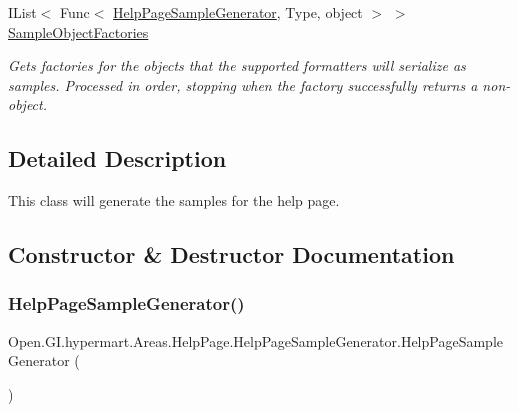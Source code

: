 \begin{DoxyCompactItemize}
I\+List$<$ Func$<$ \hyperlink{class_open_1_1_g_i_1_1hypermart_1_1_areas_1_1_help_page_1_1_help_page_sample_generator}{Help\+Page\+Sample\+Generator}, Type, object $>$ $>$ \hyperlink{class_open_1_1_g_i_1_1hypermart_1_1_areas_1_1_help_page_1_1_help_page_sample_generator_a659aa13a69376385d931264d06fbd398}{Sample\+Object\+Factories}
\begin{DoxyCompactList}\small\item\em Gets factories for the objects that the supported formatters will serialize as samples. Processed in order, stopping when the factory successfully returns a non-\/ object. \end{DoxyCompactList}\end{DoxyCompactItemize}


\subsection{Detailed Description}
This class will generate the samples for the help page. 



\subsection{Constructor \& Destructor Documentation}
\hypertarget{class_open_1_1_g_i_1_1hypermart_1_1_areas_1_1_help_page_1_1_help_page_sample_generator_aa3984bba40389ce2ca9530e02a6a2eff}{}\label{class_open_1_1_g_i_1_1hypermart_1_1_areas_1_1_help_page_1_1_help_page_sample_generator_aa3984bba40389ce2ca9530e02a6a2eff} 
\subsubsection{\texorpdfstring{Help\+Page\+Sample\+Generator()}{HelpPageSampleGenerator()}}
{\footnotesize\ttfamily Open.\+G\+I.\+hypermart.\+Areas.\+Help\+Page.\+Help\+Page\+Sample\+Generator.\+Help\+Page\+Sample\+Generator (\begin{DoxyParamCaption}{ }\end{DoxyParamCaption})}



